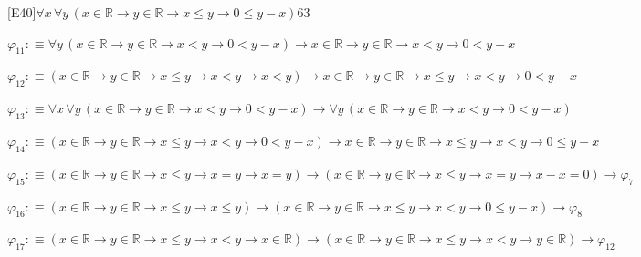 \begin{fullproof}{[E40]}{$\forall x\,\forall y\,(x \in \mathbb{R} \to y \in \mathbb{R} \to x \leq y \to 0 \leq y - x)$}{63}
\begin{abbrevlist}
\item $\varphi_{11} :\equiv \forall y\,(x \in \mathbb{R} \to y \in \mathbb{R} \to x < y \to 0 < y - x) \to x \in \mathbb{R} \to y \in \mathbb{R} \to x < y \to 0 < y - x$
\item $\varphi_{12} :\equiv (x \in \mathbb{R} \to y \in \mathbb{R} \to x \leq y \to x < y \to x < y) \to x \in \mathbb{R} \to y \in \mathbb{R} \to x \leq y \to x < y \to 0 < y - x$
\item $\varphi_{13} :\equiv \forall x\,\forall y\,(x \in \mathbb{R} \to y \in \mathbb{R} \to x < y \to 0 < y - x) \to \forall y\,(x \in \mathbb{R} \to y \in \mathbb{R} \to x < y \to 0 < y - x)$
\item $\varphi_{14} :\equiv (x \in \mathbb{R} \to y \in \mathbb{R} \to x \leq y \to x < y \to 0 < y - x) \to x \in \mathbb{R} \to y \in \mathbb{R} \to x \leq y \to x < y \to 0 \leq y - x$
\item $\varphi_{15} :\equiv (x \in \mathbb{R} \to y \in \mathbb{R} \to x \leq y \to x = y \to x = y) \to (x \in \mathbb{R} \to y \in \mathbb{R} \to x \leq y \to x = y \to x - x = 0) \to \varphi_{7}$
\item $\varphi_{16} :\equiv (x \in \mathbb{R} \to y \in \mathbb{R} \to x \leq y \to x \leq y) \to (x \in \mathbb{R} \to y \in \mathbb{R} \to x \leq y \to x < y \to 0 \leq y - x) \to \varphi_{8}$
\item $\varphi_{17} :\equiv (x \in \mathbb{R} \to y \in \mathbb{R} \to x \leq y \to x < y \to x \in \mathbb{R}) \to (x \in \mathbb{R} \to y \in \mathbb{R} \to x \leq y \to x < y \to y \in \mathbb{R}) \to \varphi_{12}$
\end{abbrevlist}
\end{fullproof}
